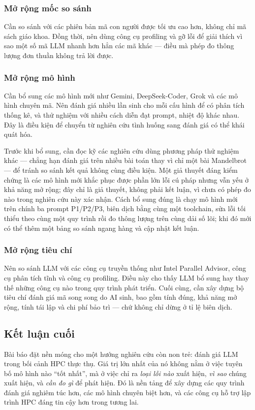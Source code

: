 \subsubsection{Mở rộng mốc so sánh}

Cần so sánh với các phiên bản mã con người được tối ưu cao hơn, không chỉ mã sách
giáo khoa. Đồng thời, nên dùng công cụ profiling và gỡ lỗi để giải thích vì sao
một số mã LLM nhanh hơn hẳn các mã khác — điều mà phép đo thông lượng đơn thuần
không trả lời được.

\subsubsection{Mở rộng mô hình}

Cần bổ sung các mô hình mới như Gemini, DeepSeek-Coder, Grok và các mô hình chuyên
mã. Nên đánh giá nhiều lần sinh cho mỗi cấu hình để có phân tích thống kê, và thử
nghiệm với nhiều cách diễn đạt prompt, nhiệt độ khác nhau. Đây là điều kiện để
chuyển từ nghiên cứu tình huống sang đánh giá có thể khái quát hóa.

Trước khi bổ sung, cần đọc kỹ các nghiên cứu dùng phương pháp thử nghiệm khác —
chẳng hạn đánh giá trên nhiều bài toán thay vì chỉ một bài Mandelbrot — để tránh
so sánh kết quả không cùng điều kiện. Một giả thuyết đáng kiểm chứng là các mô hình
mới khắc phục được phần lớn lỗi cú pháp nhưng vẫn yếu ở khả năng mở rộng;
đây chỉ là giả thuyết, không phải kết luận, vì chưa có phép đo nào trong nghiên cứu
này xác nhận. Cách bổ sung đúng là chạy mô hình mới trên chính ba prompt P1/P2/P3,
biên dịch bằng cùng một toolchain, sửa lỗi tối thiểu theo cùng một quy trình rồi đo
thông lượng trên cùng dải số lõi; khi đó mới có thể thêm một bảng so sánh ngang
hàng và cập nhật kết luận.

\subsubsection{Mở rộng tiêu chí}

Nên so sánh LLM với các công cụ truyền thống như Intel Parallel Advisor, công cụ
phân tích tĩnh và công cụ profiling. Điều này cho thấy LLM bổ sung hay thay thế
những công cụ nào trong quy trình phát triển. Cuối cùng, cần xây dựng bộ tiêu chí
đánh giá mã song song do AI sinh, bao gồm tính đúng, khả năng mở rộng, tính tái
lập và chi phí bảo trì — chứ không chỉ dừng ở tỉ lệ biên dịch.

\subsection{Kết luận cuối}

Bài báo đặt nền móng cho một hướng nghiên cứu còn non trẻ: đánh giá LLM trong bối
cảnh HPC thực thụ. Giá trị lớn nhất của nó không nằm ở việc tuyên bố mô hình nào
“tốt nhất”, mà ở việc chỉ ra \emph{loại lỗi nào} xuất hiện, \emph{vì sao} chúng
xuất hiện, và \emph{cần đo gì} để phát hiện. Đó là nền tảng để xây dựng các quy
trình đánh giá nghiêm túc hơn, các mô hình chuyên biệt hơn, và các công cụ hỗ trợ
lập trình HPC đáng tin cậy hơn trong tương lai.
